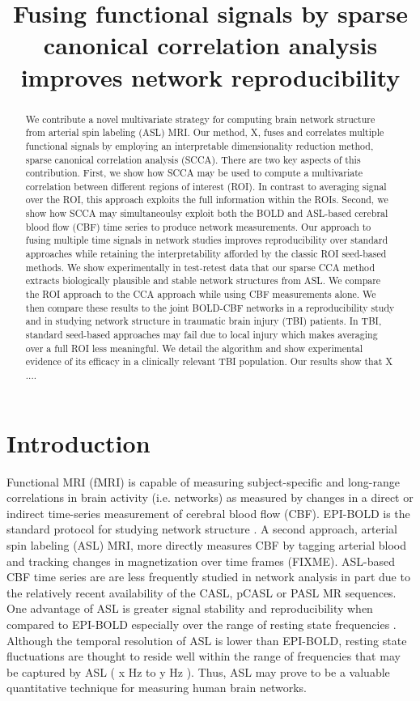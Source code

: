 \documentclass{llncs}
\title{Fusing functional signals by sparse canonical correlation analysis improves network reproducibility}
\begin{document}
\maketitle
\begin{abstract}
We contribute a novel multivariate strategy for computing brain network structure from arterial spin labeling (ASL) MRI.  Our method, X, fuses and correlates multiple functional signals by employing an interpretable dimensionality reduction method, sparse canonical correlation analysis (SCCA).  There are two key aspects of this contribution.  First, we show how SCCA may be used to compute a multivariate correlation between different regions of interest (ROI).  In contrast to averaging signal over the ROI, this approach exploits the full information within the ROIs.  Second, we show how SCCA may simultaneoulsy exploit both the BOLD and ASL-based cerebral blood flow (CBF) time series to produce network measurements.  Our approach to fusing multiple time signals in network studies improves reproducibility over standard approaches while retaining the interpretability afforded by the classic ROI seed-based methods.  We show experimentally in test-retest data that our sparse CCA method extracts biologically plausible and stable network structures from ASL.  We compare the ROI approach to the CCA approach while using CBF measurements alone.  We then compare these results to the joint BOLD-CBF networks in a reproducibility study and in studying network structure in traumatic brain injury (TBI) patients.  In TBI, standard seed-based approaches may fail due to local injury which makes averaging over a full ROI less meaningful.  We detail the algorithm and show experimental evidence of its efficacy in a clinically relevant TBI population.  Our results show that X ....  
\end{abstract}

\section*{Introduction}
Functional MRI (fMRI) is capable of measuring subject-specific and long-range correlations in brain activity (i.e. networks) as measured by changes in a direct or indirect time-series measurement of cerebral blood flow (CBF).  EPI-BOLD is the standard protocol for studying network structure \cite{Bullmore2009}.  A second approach, arterial spin labeling (ASL) MRI, more directly measures CBF by tagging arterial blood and tracking changes in magnetization over time frames (FIXME).  ASL-based CBF time series are are less frequently studied in network analysis in part due to the relatively recent availability of the CASL, pCASL or PASL MR sequences.  One advantage of ASL is greater signal stability and reproducibility when compared to EPI-BOLD especially over the range of resting state frequencies \cite{Aguirre2002}.  Although the temporal resolution of ASL is lower than EPI-BOLD, resting state fluctuations are thought to reside well within the range of frequencies that may be captured by ASL ( x Hz to y Hz ).  Thus, ASL may prove to be a valuable quantitative technique for measuring human brain networks.
\cite{Implementation of Quantitative Perfusion Imaging Techniques for Functional Brain Mapping using Pulsed Arterial Spin Labeling}
\end{document}
